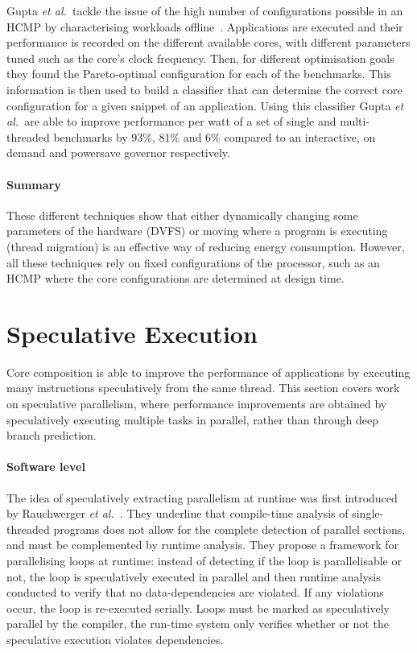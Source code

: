 Gupta {\it et al.~}tackle the issue of the high number of configurations possible in an HCMP by characterising workloads offline~\cite{Gupta2017Dypo}.
Applications are executed and their performance is recorded on the different available cores, with different parameters tuned such as the core's clock frequency.
Then, for different optimisation goals they found the Pareto-optimal configuration for each of the benchmarks.
This information is then used to build a classifier that can determine the correct core configuration for a given snippet of an application.
Using this classifier Gupta {\it et al.~}are able to improve performance per watt of a set of single and multi-threaded benchmarks by 93\%, 81\% and 6\% compared to an interactive, on demand and powersave governor respectively.

\paragraph*{Summary}
These different techniques show that either dynamically changing some parameters of the hardware (DVFS) or moving where a program is executing (thread migration) is an effective way of reducing energy consumption.
However, all these techniques rely on fixed configurations of the processor, such as an HCMP where the core configurations are determined at design time. 
\vspace{-1em}
\section{Speculative Execution}
Core composition is able to improve the performance of applications by executing many instructions speculatively from the same thread.
This section covers work on speculative parallelism, where performance improvements are obtained by speculatively executing multiple tasks in parallel, rather than through deep branch prediction.

\paragraph*{Software level}
The idea of speculatively extracting parallelism at runtime was first introduced by Rauchwerger {\it et al.~}\cite{runtimeSpec}.
They underline that compile-time analysis of single-threaded programs does not allow for the complete detection of parallel sections, and must be complemented by runtime analysis.
They propose a framework for parallelising loops at runtime: instead of detecting if the loop is parallelisable or not, the loop is speculatively executed in parallel and then runtime analysis conducted to verify that no data-dependencies are violated.
If any violations occur, the loop is re-executed serially.
Loops must be marked as speculatively parallel by the compiler, the run-time system only verifies whether or not the speculative execution violates dependencies.

